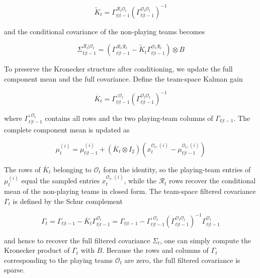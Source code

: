 \begin{equation}
    \tilde{K}_t = \Gamma^{\mathcal{R}_t\mathcal{O}_t}_{t|t-1} (\Gamma^{\mathcal{O}_t\mathcal{O}_t}_{t|t-1})^{-1} \nonumber
\end{equation}

and the conditional covariance of the non-playing teams becomes

\begin{equation}
    \Sigma_{t|t-1}^{\mathcal{R}_t|\mathcal{O}_t} = \left( \Gamma^{\mathcal{R}_t\mathcal{R}_t}_{t|t-1} - \tilde{K}_t \Gamma^{\mathcal{O}_t\mathcal{R}_t}_{t|t-1} \right) \otimes B \nonumber
\end{equation}

To preserve the Kronecker structure after conditioning, we update the full component mean and the full covariance. Define the team-space Kalman gain

\begin{equation}
    \overline{K}_t = \Gamma_{t|t-1}^{:\mathcal{O}_t} \left( \Gamma_{t|t-1}^{\mathcal{O}_t\mathcal{O}_t} \right)^{-1} \nonumber
\end{equation}

where $\Gamma_{t|t-1}^{:\mathcal{O}_t}$ contains all rows and the two playing-team columns of $\Gamma_{t|t-1}$. The complete component mean is updated as

\begin{equation}
    \mu_t^{(i)} = \mu_{t|t-1}^{(i)} + (\overline{K}_t \otimes I_2) \left( x_t^{\mathcal{O}_t,(i)} - \mu_{t|t-1}^{\mathcal{O}_t,(i)} \right) \nonumber
\end{equation}

The rows of $\overline{K}_t$ belonging to $\mathcal{O}_t$ form the identity, so the playing-team entries of $\mu_t^{(i)}$ equal the sampled entries $x_t^{\mathcal{O}_t,(i)}$, while the $\mathcal{R}_t$ rows recover the conditional mean of the non-playing teams in closed form. The team-space filtered covariance $\Gamma_t$ is defined by the Schur complement

\begin{equation}
    \Gamma_t = \Gamma_{t|t-1} - \overline{K}_t \Gamma_{t|t-1}^{\mathcal{O}_t} = \Gamma_{t|t-1} - \Gamma_{t|t-1}^{:\mathcal{O}_t} \left( \Gamma_{t|t-1}^{\mathcal{O}_t\mathcal{O}_t} \right)^{-1} \Gamma_{t|t-1}^{\mathcal{O}_t} \nonumber
\end{equation}

and hence to recover the full filtered covariance $\Sigma_t$, one can simply compute the Kronecker product of $\Gamma_t$ with $B$. Because the rows and columns of $\Gamma_t$ corresponding to the playing teams $\mathcal{O}_t$ are zero, the full filtered covariance is sparse.

